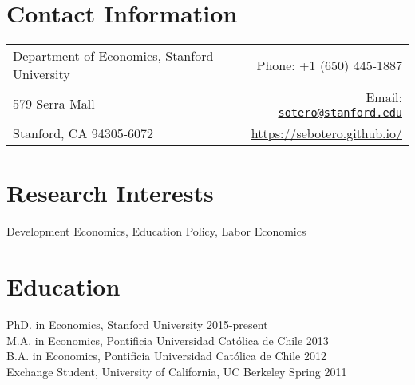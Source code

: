 \documentclass[margin,line]{res}
\begin{document}

\begin{resume}
\section{\sc Contact Information}
\vspace{.05in}
\hspace{-0.1in}
\begin{tabular}{lr}
Department of Economics, Stanford University      &  \hspace{1.35in} \hfill Phone:  +1 (650) 445-1887 \\            
579 Serra Mall  & \hfill   Email:  \href{mailto:sotero@stanford.edu}{\nolinkurl{sotero@stanford.edu}} \\      
Stanford, CA 94305-6072  & \hfill  \href{https://sebotero.github.io/}{https://sebotero.github.io/}  \\     
\end{tabular}


\section{\sc Research Interests}
Development Economics, Education Policy, Labor Economics

\section{\sc Education}
PhD. in Economics, Stanford University \hfill 2015-present \\
M.A. in Economics, Pontificia Universidad Cat\'olica de Chile \hfill 2013 \\
B.A. in Economics, Pontificia Universidad Cat\'olica de Chile \hfill 2012 \\
Exchange Student, University of California, UC Berkeley \hfill Spring 2011

%




\end{resume}
\end{document}
